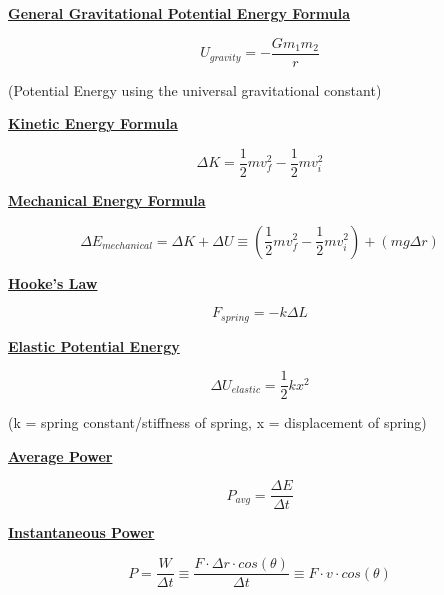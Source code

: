 \documentclass[12pt, letterpaper]{article}
\begin{document}
\normalsize{\centerline{\textbf{\underline{General Gravitational Potential Energy Formula}}}}
\[U_{gravity} = - \frac{G m_1 m_2}{r}\]
\small{\centerline{(Potential Energy using the universal gravitational constant)}}
\vspace{0.1em}

\normalsize{\centerline{\textbf{\underline{Kinetic Energy Formula}}}}
\[\Delta K = \frac{1}{2}mv^2_f - \frac{1}{2}mv^2_i\]

\normalsize{\centerline{\textbf{\underline{Mechanical Energy Formula}}}}
\[\Delta E_{mechanical} = \Delta K + \Delta U \equiv (\frac{1}{2}mv^2_f - \frac{1}{2}mv^2_i) + (mg \Delta r)\]

\normalsize{\centerline{\textbf{\underline{Hooke's Law}}}}
\[F_{spring} = -k \Delta L\]

\normalsize{\centerline{\textbf{\underline{Elastic Potential Energy}}}}
\[\Delta U_{elastic} = \frac{1}{2}kx^2\]
\small{\centerline{(k = spring constant/stiffness of spring, x = displacement of spring)}}
\vspace{0.1em}

\newpage

\normalsize{\centerline{\textbf{\underline{Average Power}}}}
\[P_{avg} = \frac{\Delta E}{\Delta t}\]

\normalsize{\centerline{\textbf{\underline{Instantaneous Power}}}}
\[P = \frac{W}{\Delta t} \equiv \frac{F \cdot \Delta r \cdot cos(\theta)}{\Delta t} \equiv F \cdot v \cdot cos(\theta)\]
\end{document}
